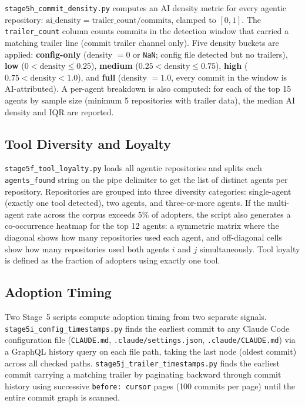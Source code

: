 \texttt{stage5h\_commit\_density.py} computes an AI density metric for every agentic repository: $\text{ai\_density} = \text{trailer\_count} / \text{commits}$, clamped to $[0, 1]$. The \texttt{trailer\_count} column counts commits in the detection window that carried a matching trailer line (commit trailer channel only). Five density buckets are applied: \textbf{config-only} (density $= 0$ or \texttt{NaN}; config file detected but no trailers), \textbf{low} ($0 < \text{density} \leq 0.25$), \textbf{medium} ($0.25 < \text{density} \leq 0.75$), \textbf{high} ($0.75 < \text{density} < 1.0$), and \textbf{full} (density $= 1.0$, every commit in the window is AI-attributed). A per-agent breakdown is also computed: for each of the top 15 agents by sample size (minimum 5 repositories with trailer data), the median AI density and IQR are reported.

\subsection{Tool Diversity and Loyalty}

\texttt{stage5f\_tool\_loyalty.py} loads all agentic repositories and splits each \texttt{agents\_found} string on the pipe delimiter to get the list of distinct agents per repository. Repositories are grouped into three diversity categories: single-agent (exactly one tool detected), two agents, and three-or-more agents. If the multi-agent rate across the corpus exceeds 5\% of adopters, the script also generates a co-occurrence heatmap for the top 12 agents: a symmetric matrix where the diagonal shows how many repositories used each agent, and off-diagonal cells show how many repositories used both agents $i$ and $j$ simultaneously. Tool loyalty is defined as the fraction of adopters using exactly one tool.

\subsection{Adoption Timing}

Two Stage~5 scripts compute adoption timing from two separate signals. \texttt{stage5i\_config\_timestamps.py} finds the earliest commit to any Claude Code configuration file (\texttt{CLAUDE.md}, \texttt{.claude/settings.json}, \texttt{.claude/CLAUDE.md}) via a GraphQL history query on each file path, taking the last node (oldest commit) across all checked paths. \texttt{stage5j\_trailer\_timestamps.py} finds the earliest commit carrying a matching trailer by paginating backward through commit history using successive \texttt{before: cursor} pages (100 commits per page) until the entire commit graph is scanned.

